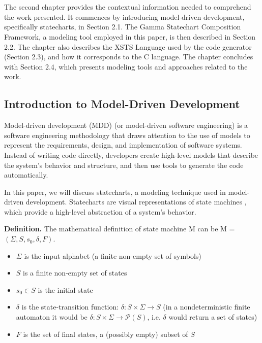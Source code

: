 
\chapter{\hatter}

The second chapter provides the contextual information needed to comprehend the work presented. It commences by introducing model-driven development, specifically statecharts, in Section 2.1. The Gamma Statechart Composition Framework, a modeling tool employed in this paper, is then described in Section 2.2. The chapter also describes the XSTS Language used by the code generator (Section 2.3), and how it corresponds to the C language. The chapter concludes with Section 2.4, which presents modeling tools and approaches related to the work.

\section{Introduction to Model-Driven Development}

Model-driven development \cite{MDD} (MDD) (or model-driven software engineering) is a software engineering methodology that draws attention to the use of models to represent the requirements, design, and implementation of software systems. Instead of writing code directly, developers create high-level models that describe the system's behavior and structure, and then use tools to generate the code automatically.

In this paper, we will discuss statecharts, a modeling technique used in model-driven development. Statecharts are visual representations of state machines \cite{StateMachine}, which provide a high-level abstraction of a system's behavior.

\textbf{Definition.} The mathematical definition of state machine M can be M = $(\Sigma, S, s_0, \delta, F)$.

\begin{itemize}
	\item $\Sigma$ is the input alphabet (a finite non-empty set of symbols)
	\item $S$ is a finite non-empty set of states
	\item $s_0 \in S$ is the initial state
	\item $\delta$ is the state-transition function: $\delta:S \times \Sigma \rightarrow S$ (in a nondeterministic finite automaton it would be $\delta:S \times \Sigma \rightarrow \mathcal{P}(S)$, i.e. $\delta$ would return a set of states)
	\item $F$ is the set of final states, a (possibly empty) subset of $S$
\end{itemize}

